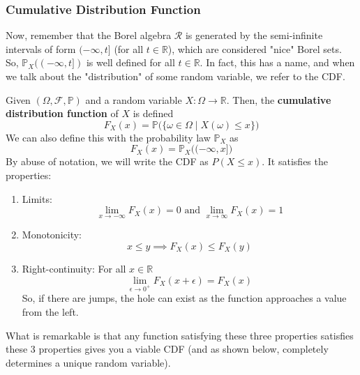   \subsubsection{Cumulative Distribution Function}

    Now, remember that the Borel algebra $\mathcal{R}$ is generated by the semi-infinite intervals of form $(-\infty, t]$ (for all $t \in \mathbb{R}$), which are considered "nice" Borel sets. So, $\mathbb{P}_X( (-\infty, t])$ is well defined for all $t \in \mathbb{R}$. In fact, this has a name, and when we talk about the "distribution" of some random variable, we refer to the CDF. 

    \begin{definition}
      Given $(\Omega, \mathcal{F}, \mathbb{P})$ and a random variable $X: \Omega \rightarrow \mathbb{R}$. Then, the \textbf{cumulative distribution function} of $X$ is defined 
      \begin{equation}
        F_X (x) =\mathbb{P}\big( \{\omega \in \Omega \mid X(\omega) \leq x\} \big)
      \end{equation}
      We can also define this with the probability law $\mathbb{P}_X$ as 
      \begin{equation}
        F_X (x) = \mathbb{P}_X \big( (-\infty, x] \big)
      \end{equation}
      By abuse of notation, we will write the CDF as $P(X \leq x)$. It satisfies the properties: 
      \begin{enumerate}
        \item Limits: 
        \begin{equation}
          \lim_{x \rightarrow -\infty} F_X (x) = 0 \text{ and } \lim_{x \rightarrow \infty} F_X (x) = 1
        \end{equation}
        \item Monotonicity: 
        \begin{equation}
        x \leq y \implies F_X (x) \leq F_X (y)
        \end{equation}
        \item Right-continuity: For all $x \in \mathbb{R}$
        \begin{equation}
          \lim_{\epsilon \rightarrow 0^+} F_X (x + \epsilon) = F_X (x)
        \end{equation}
        So, if there are jumps, the hole can exist as the function approaches a value from the left. 
      \end{enumerate}
      What is remarkable is that any function satisfying these three properties satisfies these 3 properties gives you a viable CDF (and as shown below, completely determines a unique random variable). 
    \end{definition}


